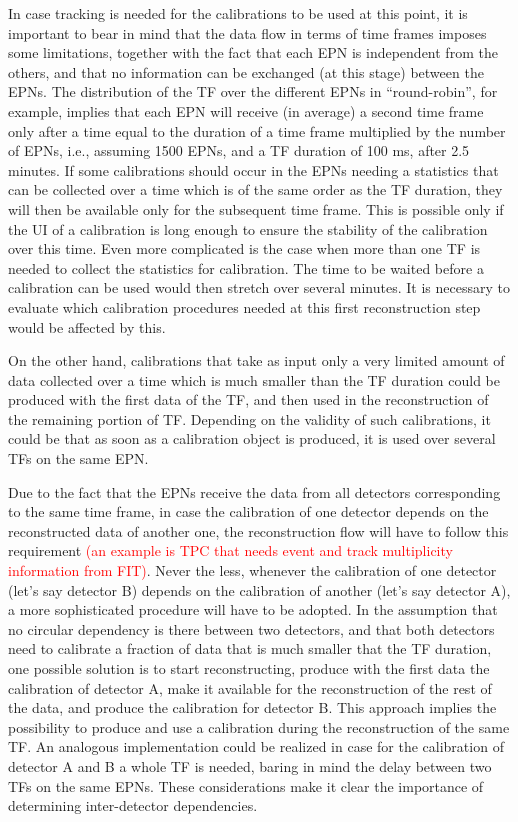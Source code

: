 In case tracking is needed for the calibrations to be used at this point, it is important to bear in mind that the data flow in 
terms of time frames imposes some limitations, together with the fact that each EPN is independent from the 
others, and that no information can be exchanged (at this stage) between the EPNs. The distribution of the TF over 
the different EPNs in ``round-robin'', for example, implies that each
EPN will receive (in average) a second time frame only after a 
time equal to the duration of a time frame multiplied by the number of EPNs, i.e., assuming 1500 EPNs, and a TF duration 
of 100 ms, after 2.5 minutes. If some calibrations should occur in the EPNs needing a statistics that can be collected over a 
time which is of the same order as the TF duration, they will then be available only for the subsequent time frame. This 
is possible only if the UI of a calibration is long enough to ensure the stability of the calibration over this time. Even more
complicated is the case when more than one TF is needed to collect the statistics for calibration. The time to be waited
before a calibration can be used would then stretch over several minutes. It is necessary to evaluate which calibration
procedures needed at this first reconstruction step would be affected by this. 

On the other hand, calibrations that take as input only a very limited amount of data collected over a time which is much
smaller than the TF duration could be produced with the first data of the TF, and then used in the reconstruction of the
remaining portion of TF. Depending on the validity of such calibrations, it could be that as soon as a calibration object 
is produced, it is used over several TFs on the same EPN. 

Due to the fact that the EPNs receive the data from all detectors corresponding to the same time frame, in case the 
calibration of one detector depends on the reconstructed data of another one, the reconstruction flow will have to 
follow this requirement \textcolor{red}{(an example is TPC that needs event and track multiplicity information from FIT)}.
Never the less, whenever the calibration of one detector (let's say detector B) depends on the calibration of another
(let's say detector A), a more sophisticated
procedure will have to be adopted. In the assumption that no circular dependency is there between two detectors, 
and that both detectors need to calibrate a fraction of data that is much smaller that the TF duration, one possible 
solution is to start reconstructing, produce with the first data the calibration of detector A, make it available for 
the reconstruction of the rest of the data, and produce the calibration for detector B. This approach implies the 
possibility to produce and use a calibration during the reconstruction of the same TF. An analogous implementation
could be realized in case for the calibration of detector A and B a whole TF is needed, baring in mind the delay
between two TFs on the same EPNs. These considerations make it clear the importance of determining 
inter-detector dependencies.

